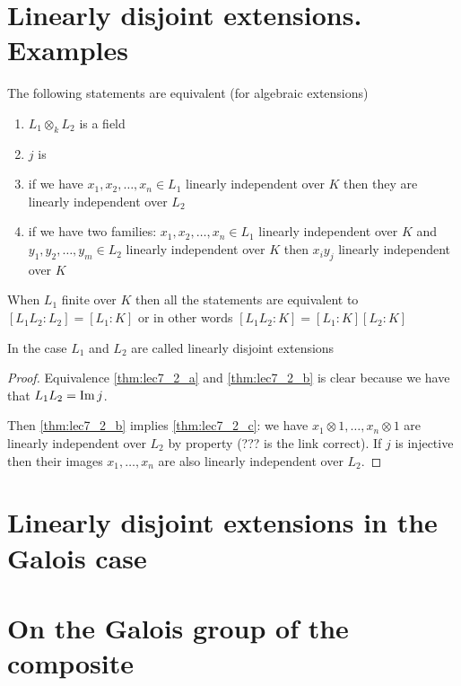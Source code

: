 \section{Linearly disjoint extensions. Examples}

\begin{theorem}
  The following statements are equivalent (for algebraic extensions)
  \begin{enumerate}
  \item $L_1 \otimes_k L_2$ is a field \label{thm:lec7_2_a}
  \item $j$ is  \label{thm:lec7_2_b}
  \item if we have $x_1, x_2, \dots, x_n \in L_1$ linearly independent
    over $K$ then they are linearly independent
    over $L_2$ \label{thm:lec7_2_c}
  \item if we have two families: $x_1, x_2, \dots, x_n \in L_1$ linearly independent
    over $K$ and  $y_1, y_2, \dots, y_m \in L_2$ linearly independent
    over $K$ then $x_i y_j$ linearly independent over $K$
    \label{thm:lec7_2_d}
  \end{enumerate}
  When $L_1$ finite over $K$ then all the statements are equivalent to
  $\left[L_1 L_2 : L_2\right] = \left[L_1 : K\right]$ or in other
  words
  $\left[L_1 L_2 : K\right] = \left[L_1 : K\right] \left[L_2 :
    K\right]$
  \begin{definition}
    In the case $L_1$ and $L_2$ are called linearly disjoint extensions
    \label{def:linearlydisjoint}
  \end{definition}
  \begin{proof}
    Equivalence \ref{thm:lec7_2_a} and \ref{thm:lec7_2_b} is clear
    because we have that $L_1 L_2 = \operatorname{Im} j$.

    Then \ref{thm:lec7_2_b} implies \ref{thm:lec7_2_c}: we have
    $x_1 \otimes 1, \dots, x_n \otimes 1$ are linearly independent
    over $L_2$ by  property (??? is the link
    correct). If $j$ is injective then their images $x_1, \dots, x_n$
    are also linearly independent over $L_2$.
  \end{proof}
  \label{thm:lec7_2}
\end{theorem}

\section{Linearly disjoint extensions in the Galois case}
\section{On the Galois group of the composite}
